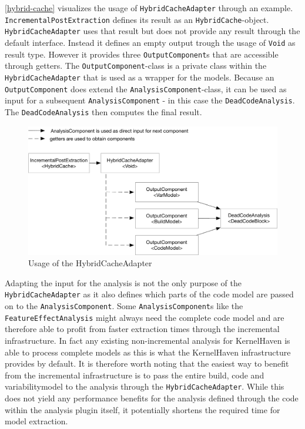\documentclass[a4paper]{article}
\begin{document}
\autoref{hybrid-cache} visualizes the usage of \texttt{Hybrid\-Cache\-Adapter} through an example. \texttt{Incremental\-Post\-Extraction} defines its result as an \texttt{Hybrid\-Cache}-object. \texttt{Hybrid\-Cache\-Adapter} uses that result but does not provide any result through the default interface. Instead it defines an empty output trough the usage of \texttt{Void} as result type. However it provides three \texttt{Output\-Component}s that are accessible through getters. The \texttt{Output\-Component}-class is a private class within the \texttt{Hybrid\-Cache\-Adapter} that is used as a wrapper for the models. Because an \texttt{Output\-Component} does extend the \texttt{Analysis\-Component}-class, it can be used as input for a subsequent \texttt{Analysis\-Component} - in this case the \texttt{Dead\-Code\-Analysis}. The \texttt{Dead\-Code\-Analysis} then computes the final result.

\begin{figure}[h] 
  \centering
  \begin{minipage}[b]{1\textwidth} 
    \caption[Usage of the HybridCacheAdapter]{Usage of the HybridCacheAdapter}\label{hybrid-cache}
    \includegraphics[width=1\textwidth]{img/HybridCacheAdapter.pdf}
  \end{minipage}
\end{figure}

Adapting the input for the analysis is not the only purpose of the \texttt{Hybrid\-Cache\-Adapter} as it also defines which parts of the code model are passed on to the \texttt{Analysis\-Component}. Some  \texttt{Analysis\-Component}s like the \texttt{FeatureEffectAnalysis} \cite{feature-effect-analysis}\cite{Nadi15wheredo} might always need the complete code model and are therefore able to profit from faster extraction times through the incremental infrastructure. In fact any existing non-incremental analysis for KernelHaven is able to process complete models as this is what the KernelHaven infrastructure provides by default. It is therefore worth noting that the easiest way to benefit from the incremental infrastructure is to pass the entire build, code and variabilitymodel to the analysis through the \texttt{Hybrid\-Cache\-Adapter}. While this does not yield any performance benefits for the analysis defined through the code within the analysis plugin itself, it potentially shortens the required time for model extraction.
\end{document}
